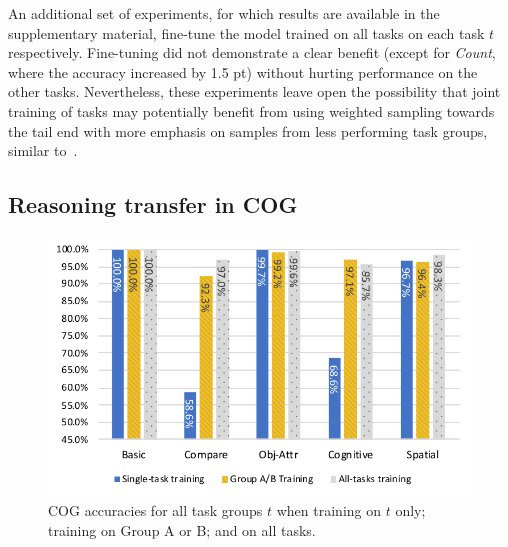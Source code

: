 An additional set of experiments, for which results are available in the supplementary material, fine-tune the model trained on all tasks on each task $t$ respectively.
Fine-tuning did not demonstrate a clear benefit (except for \textit{Count}, where the accuracy increased by 1.5 pt) without hurting performance on the other tasks. Nevertheless, these experiments leave open the possibility that joint training of tasks may potentially benefit from using weighted sampling towards the tail end with more emphasis on samples from less performing task groups, similar to~\cite{guo2018dynamic, kendall2018multi}.

\subsection{Reasoning transfer in COG}
\label{sec:reasoning-cog}

\begin{figure}[htbp]
	\centering
	\includegraphics[width=\columnwidth]{../results/COG_reasoning_transfer_new.pdf}
	\caption{COG accuracies for all task groups $t$ when training on $t$ only; training on Group A or B; and on all tasks.}
	\label{fig:COG-reasoning-results}
\end{figure}\vspace{2pt}


